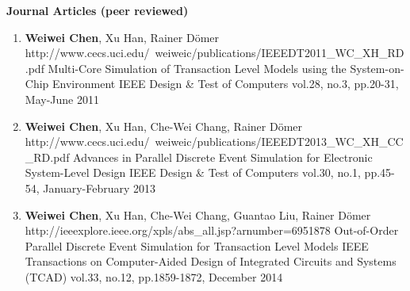 %

%
%


{\textbf{\large Journal Articles (peer reviewed)}}
\vspace{-2mm}
\begin{enumerate}

\item 
	\mypubhl
	{\textbf{Weiwei Chen}, Xu Han, Rainer D\"{o}mer}
	{http://www.cecs.uci.edu/~weiweic/publications/IEEEDT2011_WC_XH_RD.pdf}
	{Multi-Core Simulation of Transaction Level Models using the System-on-Chip Environment}
	{}
	{IEEE Design \& Test of Computers}
	{vol.28, no.3, pp.20-31, May-June 2011}
		
\item 
	\mypubhl
	{\textbf{Weiwei Chen}, Xu Han, Che-Wei Chang, Rainer D\"{o}mer}
	{http://www.cecs.uci.edu/~weiweic/publications/IEEEDT2013_WC_XH_CC_RD.pdf}
	{Advances in Parallel Discrete Event Simulation for Electronic System-Level Design} 
	{}
	{IEEE Design \& Test of Computers}
	{vol.30, no.1, pp.45-54, January-February 2013}
	
\item  
	\mypubhl
	{\textbf{Weiwei Chen}, Xu Han, Che-Wei Chang, Guantao Liu, Rainer D\"{o}mer}
	{http://ieeexplore.ieee.org/xpls/abs\_all.jsp?arnumber=6951878}
	{Out-of-Order Parallel Discrete Event Simulation for Transaction Level Models} 
	{ }
	{IEEE Transactions on Computer-Aided Design of Integrated Circuits and Systems (TCAD)} 
	{vol.33, no.12, pp.1859-1872, December 2014}
	
\end{enumerate}


